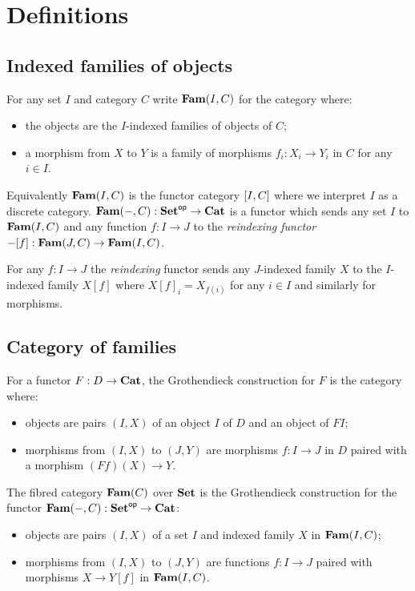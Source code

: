 \section{Definitions}

\subsection{Indexed families of objects}

For any set $I$ and category $C$ write $\mathbf{Fam}(I,C)$ for the category where:
\begin{itemize}
\item the objects are the $I$-indexed families of objects of $C$;
\item a morphism from $X$ to $Y$ is a family of morphisms $f_i: X_i \to Y_i$ in $C$ for any $i \in I$.
\end{itemize}

\noindent Equivalently $\mathbf{Fam}(I,C)$ is the functor category $[I,C]$ where we interpret $I$ as a discrete
category. $\mathbf{Fam}(-,C): \mathbf{Set}^{\mathsf{op}} \to \mathbf{Cat}$ is a functor which sends any set $I$ to $\mathbf{Fam}(I,C)$ and any
function $f: I \to J$ to the \emph{reindexing functor} $-[f]: \mathbf{Fam}(J,C) \to \mathbf{Fam}(I,C)$.

\begin{definition}[Reindexing]
For any $f: I \to J$ the \emph{reindexing} functor sends any $J$-indexed family $X$ to the $I$-indexed family
$X[f]$ where $X[f]_i = X_{f(i)}$ for any $i \in I$ and similarly for morphisms.
\end{definition}

\subsection{Category of families}

For a functor $F: D \to \mathbf{Cat}$, the Grothendieck construction for $F$ is the category where:
\begin{itemize}
\item objects are pairs $(I, X)$ of an object $I$ of $D$ and an object of $FI$;
\item morphisms from $(I, X)$ to $(J, Y)$ are morphisms $f: I \to J$ in $D$ paired with a morphism $(Ff)(X) \to Y$.
\end{itemize}

\noindent The fibred category $\mathbf{Fam}(C)$ over $\mathbf{Set}$ is the Grothendieck construction for the functor
$\mathbf{Fam}(-,C): \mathbf{Set}^{\mathsf{op}} \to \mathbf{Cat}$:
\begin{itemize}
\item objects are pairs $(I, X)$ of a set $I$ and indexed family $X$ in $\mathbf{Fam}(I,C)$;
\item morphisms from $(I, X)$ to $(J, Y)$ are functions $f: I \to J$ paired with morphisms $X \to Y[f]$ in
$\mathbf{Fam}(I,C)$.
\end{itemize}

